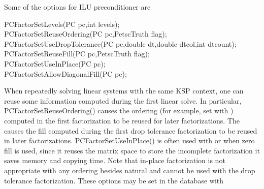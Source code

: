 Some of the options for ILU preconditioner are 
\begin{tabbing}
  PCFactorSetLevels(PC pc,int levels);\\
  PCFactorSetReuseOrdering(PC pc,PetscTruth flag);\\
  PCFactorSetUseDropTolerance(PC pc,double dt,double dtcol,int dtcount);\\
  PCFactorSetReuseFill(PC pc,PetscTruth flag);\\
  PCFactorSetUseInPlace(PC pc); \\
  PCFactorSetAllowDiagonalFill(PC pc);
\end{tabbing}
 
 
 

When repeatedly solving linear systems with the same KSP
context, one can reuse some information  computed
during the first linear solve.
In particular, PCFactorSetReuseOrdering() causes the ordering  (for example, set with 
 ) computed in the first factorization to be reused
for later factorizations.  
The  causes the 
fill computed during the first drop tolerance factorization to be reused
in later factorizations. PCFactorSetUseInPlace() is often used with 
 or  when zero fill is used, since it reuses the 
matrix space to store the incomplete factorization it saves memory and 
copying time. Note that in-place factorization is not appropriate with 
any ordering besides natural and cannot be used with the drop tolerance
factorization. These options may be set in the database with 
\begin{tabbing}
   \\
   \\
   \\
   \\
   \\
   \\
\end{tabbing}
 
 
 

